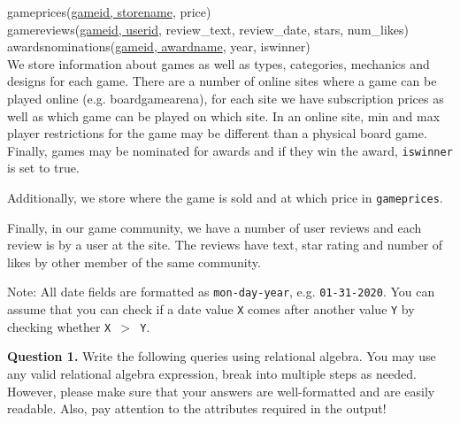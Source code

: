 \documentclass[11pt]{article}
\begin{document}
gameprices(\underline{gameid, storename}, price) \\
gamereviews(\underline{gameid, userid}, review\_text, review\_date, stars, num\_likes) \\
awardsnominations(\underline{gameid, awardname}, year, iswinner) \\

We store information about games as well as types, categories,
mechanics and designs for each game. There are a number of online
sites where a game can be played online (e.g. boardgamearena), for
each site we have subscription prices as well as which game can be
played on which site. In an online site, min and max player
restrictions for the game may be different than a physical board
game. Finally, games may be nominated for awards and if they win the
award, {\tt iswinner} is set to true.

Additionally, we store where the game is sold and at which price in
{\tt gameprices}.

Finally, in our game community, we have a number of user reviews and
each review is by a user at the site. The reviews have text, star
rating and number of likes by other member of the same community.

Note: All date fields are formatted as \verb+mon-day-year+,
e.g. \verb+01-31-2020+. You can assume that you can check if a date
value {\tt X} comes after another value {\tt Y} by checking whether
{\tt X $>$ Y}. 

\newpage

{\bf Question 1.}
Write the following queries using relational algebra. You may use any
valid relational algebra expression, break into multiple steps as
needed. However, please make sure that your answers are well-formatted
and are easily readable. Also, pay attention to the attributes
required in the output!
\end{document}
